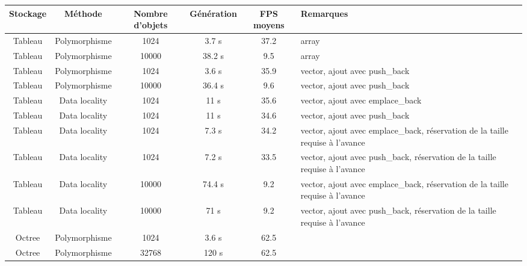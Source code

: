\documentclass[a4paper,french,12pt]{article}
\begin{document}
      \begin{center}
      
	\label{optimisations}

	
	\begin{tabular}{| c | c | c | c | c | p{4cm} |}
	    \hline
	    Stockage & Méthode & Nombre d'objets & Génération & FPS moyens & Remarques \\ \hline
	    
	    Tableau & Polymorphisme & 1024 & 3.7 s & 37.2  & array\\ \hline
	    Tableau & Polymorphisme & 10000 & 38.2 s & 9.5  & array\\ \hline
	    
	    Tableau & Polymorphisme & 1024 & 3.6 s & 35.9  & vector, ajout avec push\_back \\ \hline
	    
	    Tableau & Polymorphisme & 10000 & 36.4 s & 9.6  & vector, ajout avec push\_back \\ \hline

	    
	    Tableau & Data locality & 1024 & 11 s & 35.6  & vector, ajout avec emplace\_back\\ \hline
	    Tableau & Data locality & 1024 & 11 s & 34.6  & vector, ajout avec push\_back\\ \hline
	    
	    
	    Tableau & Data locality & 1024 & 7.3 s & 34.2  & vector, ajout avec emplace\_back, réservation de la taille
								    requise à l'avance\\ \hline
	    Tableau & Data locality & 1024 & 7.2 s & 33.5  & vector, ajout avec push\_back, réservation de la taille
								    requise à l'avance \\ \hline
								    
								    
	    Tableau & Data locality & 10000 & 74.4 s & 9.2  & vector, ajout avec emplace\_back, réservation de la taille
								    requise à l'avance\\ \hline								    
	    Tableau & Data locality & 10000 & 71 s & 9.2  & vector, ajout avec push\_back, réservation de la taille
								    requise à l'avance\\ \hline	
								    
								    
	    Octree & Polymorphisme & 1024 & 3.6 s & 62.5 & \\ \hline
	    Octree & Polymorphisme & 32768 & 120 s & 62.5 & \\ \hline
	    
	    \hline
	\end{tabular}
      \end{center}
	
\end{document}
